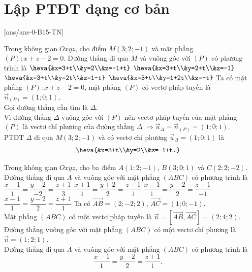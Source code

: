 \section{Lập PTĐT dạng cơ bản}
\TN
{}[ans/ans-0-B15-TN]
\setcounter{ex}{9}
\begin{ex}%
	Trong không gian $Oxyz$, cho điểm $M(3;2 ;-1)$ và mặt phẳng $(P)\colon x+z-2=0$. Đường thẳng đi qua $M$ và vuông góc với $(P)$ có phương trình là
	\choice
	{\True $\heva{&x=3+t\\&y=2\\&z=-1+t}$}
	{$\heva{&x=3+t\\&y=2+t\\&z=-1}$}
	{$\heva{&x=3+t\\&y=2t\\&z=1-t}$}
	{$\heva{&x=3+t\\&y=1+2t\\&z=-t}$}
	\loigiai
	{
	Ta có mặt phẳng $(P)\colon x+z-2=0$, mặt phẳng $(P)$ có vectơ pháp tuyến là $\overrightarrow{n}_{(P)}=(1;0;1)$.\\
		Gọi đường thẳng cần tìm là $\Delta$.\\
		Vì đường thẳng $\Delta$ vuông góc với $(P)$ nên vectơ pháp tuyến của mặt phẳng $(P)$ là vectơ chỉ phương của đường thẳng $\Delta$ $\Rightarrow \overrightarrow{u}_{\Delta}=\overrightarrow{n}_{(P)}=(1;0;1)$.\\
		PTĐT $\Delta$ đi qua $M(3;2;-1)$ và có vectơ chỉ phương $\overrightarrow{u}_{\Delta}=(1;0;1)$ là
		\[\heva{&x=3+t\\&y=2\\&z=-1+t.}\]
	}
\end{ex}
\begin{ex}%
	Trong không gian $Oxyz$, cho ba điểm $A(1;2;-1)$, $B(3;0;1)$ và $C(2;2;-2)$. Đường thẳng đi qua $A$ và vuông góc với mặt phẳng $(ABC)$ có phương trình là
	\choice
	{$\dfrac{x-1}{1}=\dfrac{y-2}{-2}=\dfrac{z+1}{3}$}
	{$\dfrac{x+1}{1}=\dfrac{y+2}{2}=\dfrac{z-1}{1}$}
	{$\dfrac{x-1}{1}=\dfrac{y-2}{2}=\dfrac{z-1}{-1}$}
	{\True $\dfrac{x-1}{1}=\dfrac{y-2}{2}=\dfrac{z+1}{1}$}
	\loigiai
	{Ta có $\overrightarrow{AB}=(2;-2;2)$, $\overrightarrow{AC}=(1;0;-1)$.\\
		Mặt phẳng $(ABC)$ có một vectơ pháp tuyến là $\vec{n}=\left[\overrightarrow{AB},\overrightarrow{AC}\right]=(2;4;2)$.\\
		Đường thẳng vuông góc với mặt phẳng $(ABC)$ có một vectơ chỉ phương là $\vec{u}=(1;2;1)$.\\
		Đường thẳng đi qua $A$ và vuông góc với mặt phẳng $(ABC)$ có phương trình là
		\[\dfrac{x-1}{1}=\dfrac{y-2}{2}=\dfrac{z+1}{1}.\]
	}
\end{ex}
